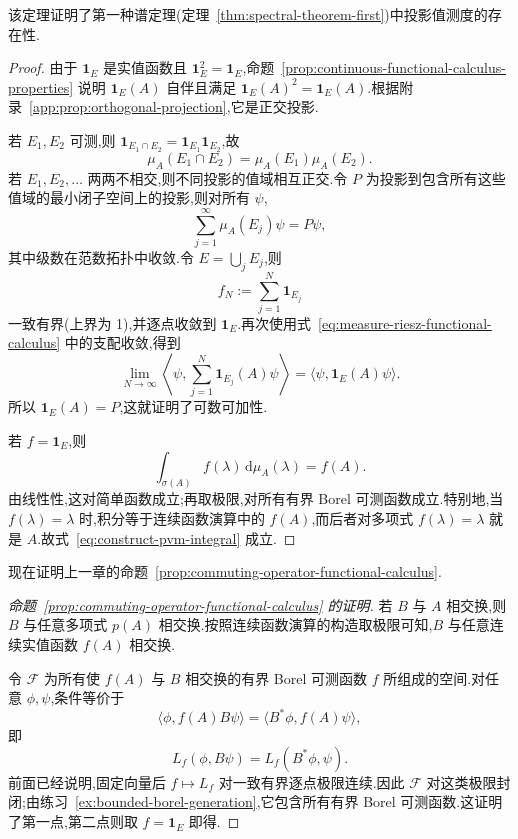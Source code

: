 该定理证明了第一种谱定理(定理~\ref{thm:spectral-theorem-first})中投影值测度的存在性.

\begin{proof}
由于 \(\mathbf{1}_{E}\) 是实值函数且 \(\mathbf{1}_{E}^{2}=\mathbf{1}_{E}\),命题~\ref{prop:continuous-functional-calculus-properties} 说明 \(\mathbf{1}_{E}(A)\) 自伴且满足 \(\mathbf{1}_{E}(A)^{2}=\mathbf{1}_{E}(A)\).根据附录~\ref{app:prop:orthogonal-projection},它是正交投影.

若 \(E_{1},E_{2}\) 可测,则 \(\mathbf{1}_{E_{1}\cap E_{2}}=\mathbf{1}_{E_{1}}\mathbf{1}_{E_{2}}\),故
\[
\mu_{A}(E_{1}\cap E_{2})=\mu_{A}(E_{1})\mu_{A}(E_{2}).
\]
若 \(E_{1},E_{2},\ldots\) 两两不相交,则不同投影的值域相互正交.令 \(P\) 为投影到包含所有这些值域的最小闭子空间上的投影,则对所有 \(\psi\),
\[
\sum_{j=1}^{\infty}\mu_{A}(E_{j})\psi=P\psi,
\]
其中级数在范数拓扑中收敛.令 \(E=\bigcup_{j}E_{j}\),则
\[
f_{N}:=\sum_{j=1}^{N}\mathbf{1}_{E_{j}}
\]
一致有界(上界为 1),并逐点收敛到 \(\mathbf{1}_{E}\).再次使用式~\eqref{eq:measure-riesz-functional-calculus} 中的支配收敛,得到
\[
\lim_{N\to\infty}\left\langle\psi,\sum_{j=1}^{N}\mathbf{1}_{E_{j}}(A)\psi\right\rangle
=\langle\psi,\mathbf{1}_{E}(A)\psi\rangle.
\]
所以 \(\mathbf{1}_{E}(A)=P\),这就证明了可数可加性.

若 \(f=\mathbf{1}_{E}\),则
\[
\int_{\sigma(A)}f(\lambda)\,\mathrm{d}\mu_{A}(\lambda)=f(A).
\label{eq:integral-equals-functional-calculus}
\]
由线性性,这对简单函数成立;再取极限,对所有有界 Borel 可测函数成立.特别地,当 \(f(\lambda)=\lambda\) 时,积分等于连续函数演算中的 \(f(A)\),而后者对多项式 \(f(\lambda)=\lambda\) 就是 \(A\).故式~\eqref{eq:construct-pvm-integral} 成立.
\end{proof}

现在证明上一章的命题~\ref{prop:commuting-operator-functional-calculus}.

\begin{proof}[命题~\ref{prop:commuting-operator-functional-calculus} 的证明]
若 \(B\) 与 \(A\) 相交换,则 \(B\) 与任意多项式 \(p(A)\) 相交换.按照连续函数演算的构造取极限可知,\(B\) 与任意连续实值函数 \(f(A)\) 相交换.

令 \(\mathcal{F}\) 为所有使 \(f(A)\) 与 \(B\) 相交换的有界 Borel 可测函数 \(f\) 所组成的空间.对任意 \(\phi,\psi\),条件等价于
\[
\langle\phi,f(A)B\psi\rangle=\langle B^{*}\phi,f(A)\psi\rangle,
\]
即
\[
L_{f}(\phi,B\psi)=L_{f}(B^{*}\phi,\psi).
\]
前面已经说明,固定向量后 \(f\mapsto L_{f}\) 对一致有界逐点极限连续.因此 \(\mathcal{F}\) 对这类极限封闭;由练习~\ref{ex:bounded-borel-generation},它包含所有有界 Borel 可测函数.这证明了第一点,第二点则取 \(f=\mathbf{1}_{E}\) 即得.
\end{proof}

